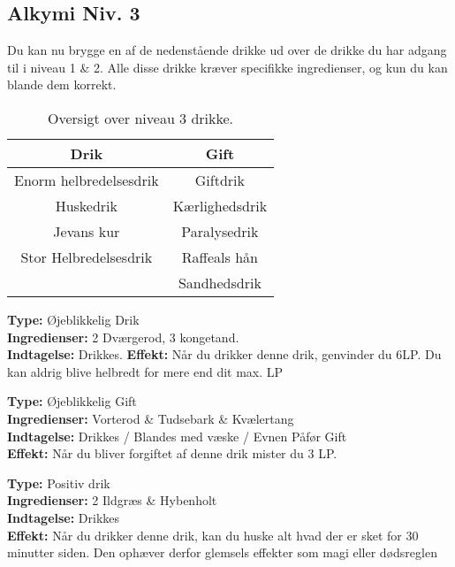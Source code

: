\subsection{Alkymi Niv. 3}
Du kan nu brygge en af de nedenstående drikke ud over de drikke du har adgang til i niveau 1 \& 2. Alle disse drikke kræver specifikke ingredienser, og kun du kan blande dem korrekt.\\

\begin{table}[H]
    \centering
    \begin{tabular}{|c|c|}
        \rowcolor{cerulean!80}\hline
        Drik & Gift \\\hline
        Enorm helbredelsesdrik & Giftdrik \\\hline
        Huskedrik &  Kærlighedsdrik \\\hline
        Jevans kur &  Paralysedrik \\\hline
        Stor Helbredelsesdrik & Raffeals hån  \\\hline
         & Sandhedsdrik  \\\hline
    \end{tabular}
    \caption{Oversigt over niveau 3 drikke.}
\end{table}

\begin{drik*}
\textbf{Type:} Øjeblikkelig Drik\\
\textbf{Ingredienser:} 2 Dværgerod, 3 kongetand.\\
\textbf{Indtagelse:} Drikkes.
\textbf{Effekt:} Når du drikker denne drik, genvinder du 6LP. Du kan aldrig blive helbredt for mere end dit max. LP
\end{drik*}

\begin{gift*}[Giftdrik]
\textbf{Type:} Øjeblikkelig Gift \\
\textbf{Ingredienser:} Vorterod \& Tudsebark \& Kvælertang\\
\textbf{Indtagelse:} Drikkes / Blandes med væske / Evnen Påfør Gift\\
\textbf{Effekt:} Når du bliver forgiftet af denne drik mister du 3 LP.\\
\end{gift*}

\begin{drik*}[Huskedrik]
\textbf{Type:} Positiv drik\\
\textbf{Ingredienser:} 2 Ildgræs \& Hybenholt\\
\textbf{Indtagelse:} Drikkes\\
\textbf{Effekt:} Når du drikker denne drik, kan du huske alt hvad der er sket for 30 minutter siden. Den ophæver derfor glemsels effekter som magi eller dødsreglen\\
\end{drik*}

